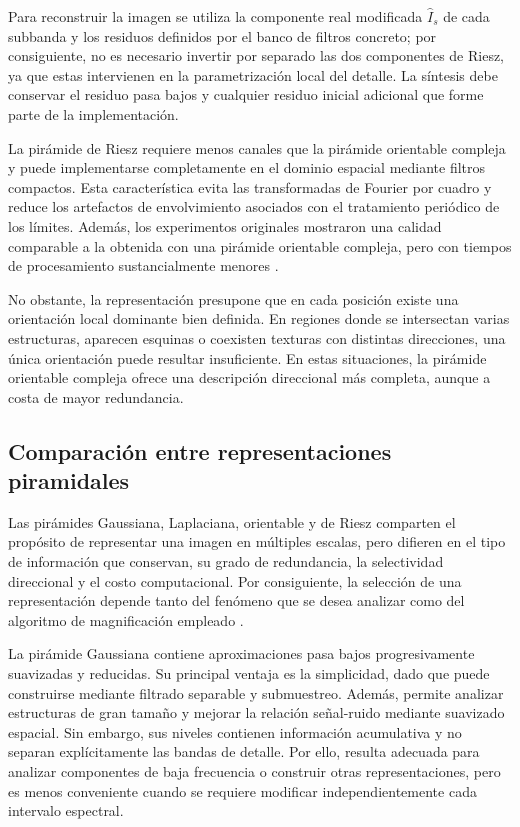 Para reconstruir la imagen se utiliza la componente real modificada $\widehat{I}_s$ de cada subbanda y los residuos definidos por el banco de filtros concreto; por consiguiente, no es necesario invertir por separado las dos componentes de Riesz, ya que estas intervienen en la parametrización local del detalle. La síntesis debe conservar el residuo pasa bajos y cualquier residuo inicial adicional que forme parte de la implementación.

La pirámide de Riesz requiere menos canales que la pirámide orientable compleja y puede implementarse completamente en el dominio espacial mediante filtros compactos. Esta característica evita las transformadas de Fourier por cuadro y reduce los artefactos de envolvimiento asociados con el tratamiento periódico de los límites. Además, los experimentos originales mostraron una calidad comparable a la obtenida con una pirámide orientable compleja, pero con tiempos de procesamiento sustancialmente menores \cite{wadhwa2014riesz}.

No obstante, la representación presupone que en cada posición existe una orientación local dominante bien definida. En regiones donde se intersectan varias estructuras, aparecen esquinas o coexisten texturas con distintas direcciones, una única orientación puede resultar insuficiente. En estas situaciones, la pirámide orientable compleja ofrece una descripción direccional más completa, aunque a costa de mayor redundancia.

	\subsection{Comparación entre representaciones piramidales}
	\label{subsubsec:comparacion_representaciones_piramidales}

Las pirámides Gaussiana, Laplaciana, orientable y de Riesz comparten el propósito de representar una imagen en múltiples escalas, pero difieren en el tipo de información que conservan, su grado de redundancia, la selectividad direccional y el costo computacional. Por consiguiente, la selección de una representación depende tanto del fenómeno que se desea analizar como del algoritmo de magnificación empleado \cite{ahmed2023overview}.

La pirámide Gaussiana contiene aproximaciones pasa bajos progresivamente suavizadas y reducidas. Su principal ventaja es la simplicidad, dado que puede construirse mediante filtrado separable y submuestreo. Además, permite analizar estructuras de gran tamaño y mejorar la relación señal-ruido mediante suavizado espacial. Sin embargo, sus niveles contienen información acumulativa y no separan explícitamente las bandas de detalle. Por ello, resulta adecuada para analizar componentes de baja frecuencia o construir otras representaciones, pero es menos conveniente cuando se requiere modificar independientemente cada intervalo espectral.

